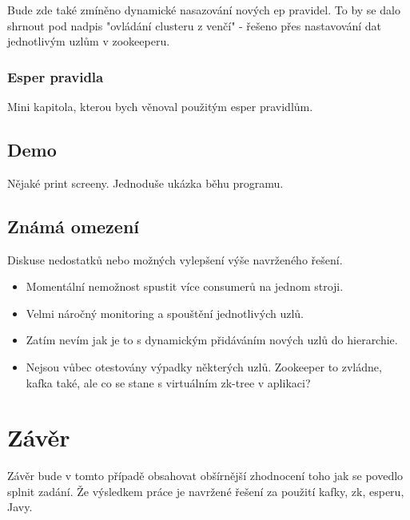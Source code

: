 \documentclass[
  digital, %
  table,   %
  nolof,     %
  nolot,     %
  twoside,
  nocover,
  monochrome,
  12pt
]{fithesis3}
\begin{document}
Bude zde také zmíněno dynamické nasazování nových ep pravidel. To by se dalo shrnout pod nadpis "ovládání clusteru z venčí" - řešeno přes nastavování dat jednotlivým uzlům v zookeeperu.

\subsection{Esper pravidla}
Mini kapitola, kterou bych věnoval použitým esper pravidlům.
\section{Demo}
Nějaké print screeny. Jednoduše ukázka běhu programu.
\section{Známá omezení}
Diskuse nedostatků nebo možných vylepšení výše navrženého řešení. 
\begin{itemize}
	\item Momentální nemožnost spustit více consumerů na jednom stroji.
	\item Velmi náročný monitoring a spouštění jednotlivých uzlů.
	\item Zatím nevím jak je to s dynamickým přidáváním nových uzlů do hierarchie.
	\item Nejsou vůbec otestovány výpadky některých uzlů. Zookeeper to zvládne, kafka také, ale co se stane s virtuálním zk-tree v aplikaci?
\end{itemize}

\chapter{Závěr}
Závěr bude v tomto případě obsahovat obšírnější zhodnocení toho jak se povedlo splnit zadání. Že výsledkem práce je navržené řešení za použití kafky, zk, esperu, Javy.
\end{document}
